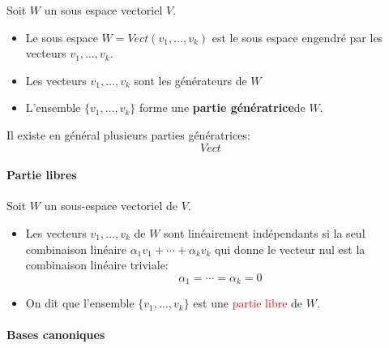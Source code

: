 

Soit $W$ un sous espace vectoriel $V$.
\begin{itemize}
    \item Le sous espace $W = Vect(v_1, \dots, v_k)$ est le sous espace engendré par les vecteurs $v_1, \dots, v_k$.
    \item Les vecteurs $v_1, \dots, v_k$ sont les générateurs de $W$
    \item L'ensemble $\{v_1, \dots, v_k\}$ forme une \textbf{partie génératrice}de $W$.
\end{itemize}
\begin{exemple}
    Il existe en général plusieurs parties génératrices:
    \[Vect\]
\end{exemple}
\paragraph{Partie libres}
Soit $W$ un sous-espace vectoriel de $V$.
\begin{itemize}
    \item Les vecteurs $v_1, \dots, v_k$ de $W$ sont linéairement indépendants si la seul combinaison linéaire $\alpha_1v_1 + \cdots + \alpha_kv_k$ qui donne le vecteur nul est la combinaison linéaire triviale:
    \[\alpha_1 = \cdots = \alpha_k = 0\]

    \item On dit que l'ensemble $\{v_1, \dots, v_k\}$ est une \textcolor{red}{partie libre} de $W$.
\end{itemize}


\paragraph{Bases canoniques}

